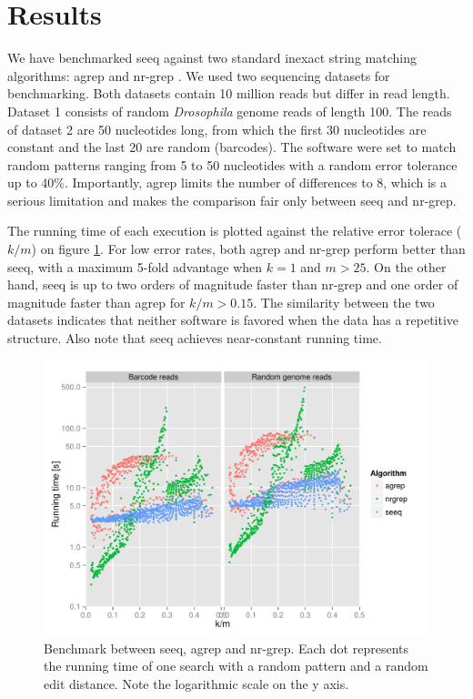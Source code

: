 \documentclass{bioinfo}
\begin{document}
\section{Results}

We have benchmarked seeq against two standard inexact string
matching algorithms: agrep \citep{Wu92} and nr-grep \citep{Nav01}. We
used two sequencing datasets for benchmarking. Both datasets contain
10 million reads but differ in read length. Dataset 1 consists of random
\textit{Drosophila} genome reads of length 100. The reads of dataset 2
are 50 nucleotides long, from which the first 30 nucleotides are constant
and the last 20 are random (barcodes). The software were set to match
random patterns ranging from 5 to 50 nucleotides with a random error
tolerance up to 40\%. Importantly, agrep limits the number of differences
to 8, which is a serious limitation and makes the comparison fair only between seeq and nr-grep.

The running time of each execution is plotted against the relative
error tolerace ($k/m$) on figure \ref{fig:results}. For low error
rates, both agrep and nr-grep perform better than seeq, with a maximum
5-fold advantage when $k=1$ and $m > 25$. On the other hand, seeq is
up to two orders of magnitude faster than nr-grep and one order of
magnitude faster than agrep for $k/m > 0.15$. The similarity between
the two datasets indicates that neither software is favored when the
data has a repetitive structure. Also note that seeq 
achieves near-constant running time.

\begin{figure}[!tpb]
\centerline{\includegraphics[scale=0.5]{results.pdf}}
\caption{Benchmark between seeq, agrep and nr-grep. Each dot represents
the running time of one search with a random pattern and a random
edit distance. Note the logarithmic scale on the y axis.}
\label{fig:results}
\end{figure}
\end{document}
